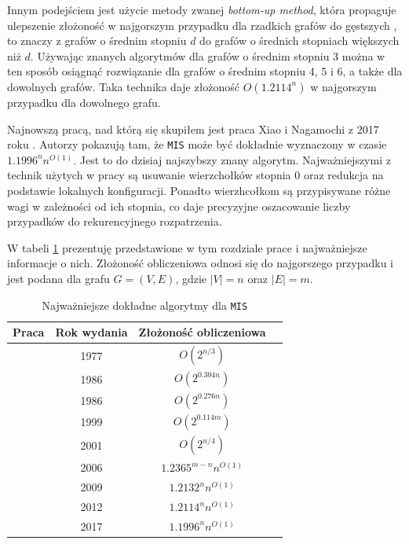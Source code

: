 \documentclass[12pt]{article}
\begin{document}
Innym podejściem jest użycie metody zwanej \textit{bottom-up method}, która propaguje ulepszenie złożoność w najgorszym przypadku dla rzadkich grafów do gęstszych \cite{bourgeois2012fast}, to znaczy z grafów o średnim stopniu $d$ do grafów o średnich stopniach większych niż $d$. Używając znanych algorytmów dla grafów o średnim stopniu 3 można w ten sposób osiągnąć rozwiązanie dla grafów o średnim stopniu 4, 5 i 6, a także dla dowolnych grafów. Taka technika daje złożoność $O(1.2114^n)$ w najgorszym przypadku dla dowolnego grafu.

Najnowszą pracą, nad którą się skupiłem jest praca Xiao i Nagamochi z 2017 roku \cite{xiao2017exact}. Autorzy pokazują tam, że \texttt{MIS} może być dokładnie wyznaczony w czasie $1.1996^nn^{O(1)}$. Jest to do dzisiaj najszybszy znany algorytm. Najważniejszymi z technik użytych w pracy są usuwanie wierzchołków stopnia 0 oraz redukcja na podstawie lokalnych konfiguracji. Ponadto wierzhcołkom są przypisywane różne wagi w zależności od ich stopnia, co daje precyzyjne oszacowanie liczby przypadków do rekurencyjnego rozpatrzenia.

W tabeli \ref{tbl:mis-exact} prezentuję przedstawione w tym rozdziale prace i najważniejsze informacje o nich. Złożoność obliczeniowa odnosi się do najgorszego przypadku i jest podana dla grafu $G=(V,E)$, gdzie $|V|=n$ oraz $|E|=m$.

\begin{table}[H]
    \centering
    \begin{tabular}{|c|c|c|c|}
        \hline
        Praca & Rok wydania & Złożoność obliczeniowa \\
        \hline
        \cite{tarjan1977finding} & 1977 & $O(2^{n/3})$ \\
        \hline
        \cite{jian19862} & 1986 & $O(2^{0.304n})$ \\
        \hline
        \cite{robson1986algorithms} & 1986 & $O(2^{0.276n})$ \\
        \hline
        \cite{beigel1999finding} & 1999 & $O(2^{0.114m})$ \\
        \hline
        \cite{robson2001finding} & 2001 & $O(2^{n/4})$ \\
        \hline
        \cite{furer2006faster} & 2006 & $1.2365^{m-n}n^{O(1)}$ \\
        \hline
        \cite{kneis2009fine} & 2009 & $1.2132^nn^{O(1)}$ \\
        \hline
        \cite{bourgeois2012fast} & 2012 & $1.2114^nn^{O(1)}$ \\
        \hline
        \cite{xiao2017exact} & 2017 & $1.1996^nn^{O(1)}$ \\
        \hline
    \end{tabular}
    \caption{Najważniejsze dokładne algorytmy dla \texttt{MIS}}
    \label{tbl:mis-exact}
\end{table}
\end{document}
